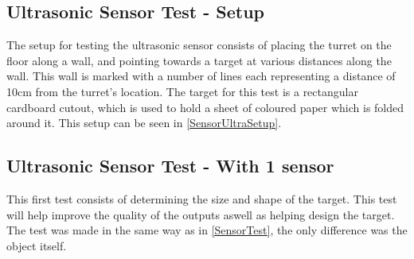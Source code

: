 \subsection{Ultrasonic Sensor Test - Setup}\label{UltraTestSetup}
The setup for testing the ultrasonic sensor consists of placing the turret on
the floor along a wall, and pointing towards a target at various distances along
the wall. This wall is marked with a number of lines each representing a
distance of 10cm from the turret's location. The target for this test is a
rectangular cardboard cutout, which is used to hold a sheet of coloured paper
which is folded around it. This setup can be seen in
\autoref{SensorUltraSetup}.


\subsection{Ultrasonic Sensor Test - With 1 sensor}\label{UltraTestPlacement}
This first test consists of determining the size and shape of the target. This
test will help improve the quality of the outputs aswell as helping design the
target. The test was made in the same way as in \autoref{SensorTest}, the
only difference was the object itself.\nl


% 
% 

